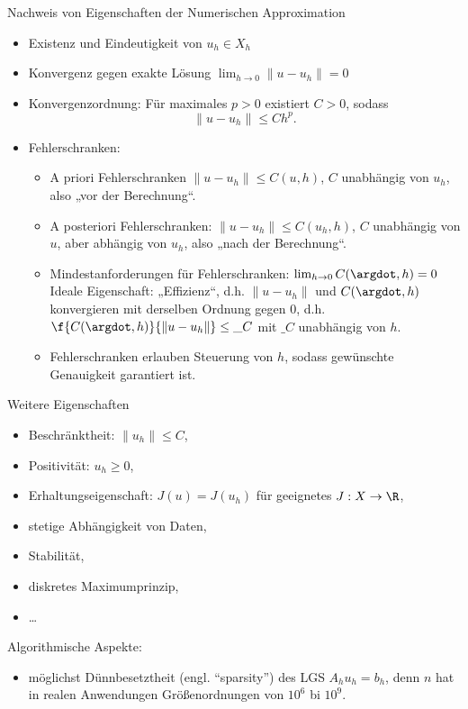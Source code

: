 \begin{nt*}
	Nachweis von Eigenschaften der Numerischen Approximation
	\begin{itemize}
		\item
			Existenz und Eindeutigkeit von $u_h \in X_h$
		\item
			Konvergenz gegen exakte Lösung $\lim_{h\to 0} \|u-u_h\| = 0$
		\item
			Konvergenzordnung: Für maximales $p > 0$ existiert $C > 0$, sodass
			\[
				\|u - u_h\| \le C h^p.
			\]
		\item
			Fehlerschranken:
			\begin{itemize}
				\item
					A priori Fehlerschranken $\|u-u_h\| \le C(u,h)$, $C$ unabhängig von $u_h$, also „vor der Berechnung“.
				\item
					A posteriori Fehlerschranken: $\|u-u_h\| \le C(u_h, h)$, $C$ unabhängig von $u$, aber abhängig von $u_h$, also „nach der Berechnung“.
				\item
					Mindestanforderungen für Fehlerschranken: $\lim_{h\to 0} C(\argdot ,h) = 0$
					Ideale Eigenschaft: „Effizienz“, d.h. $\|u-u_h\|$ und $C(\argdot, h)$ konvergieren mit derselben Ordnung gegen 0, d.h. $\f{C(\argdot, h)}{\|u-u_h\|} \le \_C$ mit $\_C$ unabhängig von $h$.
				\item
					Fehlerschranken erlauben Steuerung von $h$, sodass gewünschte Genauigkeit garantiert ist.
			\end{itemize}
	\end{itemize}
	Weitere Eigenschaften
	\begin{itemize}
		\item
			Beschränktheit: $\|u_h\| \le C$,
		\item
			Positivität: $u_h \ge 0$,
		\item
			Erhaltungseigenschaft: $J(u) = J(u_h)$ für geeignetes $J: X \to \R$,
		\item
			stetige Abhängigkeit von Daten,
		\item
			Stabilität,
		\item
			diskretes Maximumprinzip,
		\item
			\dots
	\end{itemize}
	Algorithmische Aspekte:
	\begin{itemize}
		\item
			möglichst Dünnbesetztheit (engl. “sparsity”) des LGS $A_h u_h = b_h$, denn $n$ hat in realen Anwendungen Größenordnungen von $10^6$ bi $10^9$.

\end{itemize}
\end{nt*}
